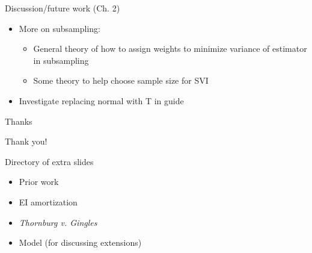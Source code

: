 \documentclass[
  ignorenonframetext,
]{beamer}
\providecommand{\tightlist}{%
  \setlength{\itemsep}{0pt}\setlength{\parskip}{0pt}}
\begin{document}
\begin{frame}{Discussion/future work (Ch. 2)}
\protect\hypertarget{discussionfuture-work-ch.-2}{}

\begin{itemize}
\tightlist
\item
  More on subsampling:

  \begin{itemize}
  \tightlist
  \item
    General theory of how to assign weights to minimize variance of
    estimator in subsampling
  \item
    Some theory to help choose sample size for SVI
  \end{itemize}
\item
  Investigate replacing normal with T in guide
\end{itemize}

\end{frame}

\begin{frame}{Thanks}
\protect\hypertarget{thanks}{}

Thank you!

\end{frame}

\begin{frame}{Directory of extra slides}
\protect\hypertarget{directory-of-extra-slides}{}

\begin{itemize}
\tightlist
\item
  Prior work
\item
  EI amortization
\item
  \emph{Thornburg v. Gingles}
\item
  Model (for discussing extensions)
\end{itemize}

\end{frame}
\end{document}
